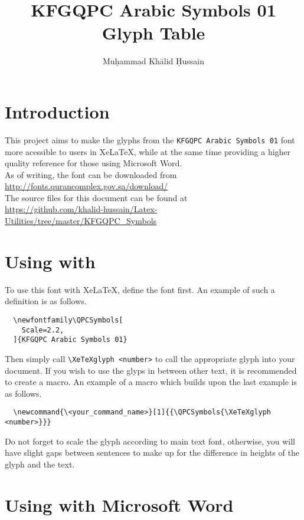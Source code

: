 \documentclass[14pt]{article}
\author{Muḥammad Khālid Ḥussain}
\title{KFGQPC Arabic Symbols 01 Glyph Table}
\date{\Hijritoday[1]}
\begin{document}
\maketitle

\section{Introduction}

This project aims to make the glyphs from the \verb$KFGQPC Arabic Symbols 01$ font more acessible to users in XeLaTeX, while at the same time providing a higher quality reference for those using Microsoft Word.\\

As of writing, the font can be downloaded from\\
\url{http://fonts.qurancomplex.gov.sa/download/}\\

The source files for this document can be found at\\
\url{https://github.com/khalid-hussain/Latex-Utilities/tree/master/KFGQPC_Symbols}

\section{Using with \XeLaTeX{}}

To use this font with XeLaTeX, define the font first. An example of such a definition is as follows.

  \begin{verbatim}
  \newfontfamily\QPCSymbols[
    Scale=2.2,
  ]{KFGQPC Arabic Symbols 01}
  \end{verbatim}

Then simply call \verb$\XeTeXglyph <number>$ to call the appropriate glyph into your document. If you wish to use the glyps in between other text, it is recommended to create a macro. An example of a macro which builds upon the last example is as follows.

  \begin{verbatim}
  \newcommand{\<your_command_name>}[1]{{\QPCSymbols{\XeTeXglyph <number>}}}
  \end{verbatim}

Do not forget to scale the glyph according to main text font, otherwise, you will have slight gaps between sentences to make up for the difference in heights of the glyph and the text.

\section{Using with Microsoft Word}
\end{document}
